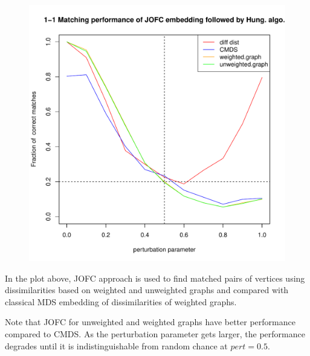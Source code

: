\documentclass[11pt]{article} %
\begin{document}
\begin{figure}
  \includegraphics[scale=0.65]{FidCommPapergraph-plot-1.pdf}
\end{figure}


In the plot above, JOFC approach is used to find  matched pairs of vertices using  dissimilarities based on weighted and unweighted graphs and  compared with classical MDS embedding of dissimilarities of weighted graphs.

Note that JOFC for unweighted and weighted graphs  have better performance compared to CMDS. As the perturbation parameter gets larger, the performance degrades until it is indistinguishable from random chance at $pert=0.5$.
\end{document}
